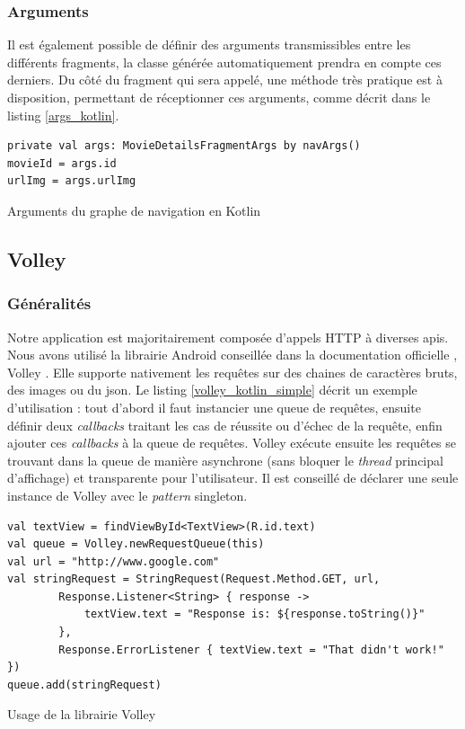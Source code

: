 \subsubsection{Arguments}
Il est également possible de définir des arguments transmissibles entre les différents fragments, la classe générée automatiquement prendra en compte ces derniers. Du côté du fragment qui sera appelé, une méthode très pratique est à disposition, permettant de réceptionner ces arguments, comme décrit dans le listing \ref{args_kotlin}.
\bigbreak
\begin{code}
    \begin{verbatim}
private val args: MovieDetailsFragmentArgs by navArgs()
movieId = args.id
urlImg = args.urlImg
    \end{verbatim}
    \caption{Arguments du graphe de navigation en Kotlin}
    \label{args_kotlin}
\end{code}
\bigbreak


\subsection{Volley}
\subsubsection{Généralités}
Notre application est majoritairement composée d'appels HTTP à diverses \acrshort{api}s. Nous avons utilisé la librairie Android conseillée dans la documentation officielle \cite{docandroid}, Volley \cite{volley}. Elle supporte nativement les requêtes sur des chaines de caractères bruts, des images ou du \acrshort{json}. Le listing \ref{volley_kotlin_simple} décrit un exemple d'utilisation : tout d'abord il faut instancier une queue de requêtes, ensuite définir deux \textit{callbacks} traitant les cas de réussite ou d'échec de la requête, enfin ajouter ces \textit{callbacks} à la queue de requêtes. Volley exécute ensuite les requêtes se trouvant dans la queue de manière asynchrone (sans bloquer le \textit{thread} principal d'affichage) et transparente pour l'utilisateur. Il est conseillé de déclarer une seule instance de Volley avec le \textit{pattern} singleton.
\bigbreak
\begin{code}
    \begin{verbatim}
val textView = findViewById<TextView>(R.id.text)
val queue = Volley.newRequestQueue(this)
val url = "http://www.google.com"
val stringRequest = StringRequest(Request.Method.GET, url,
        Response.Listener<String> { response ->
            textView.text = "Response is: ${response.toString()}"
        },
        Response.ErrorListener { textView.text = "That didn't work!" })
queue.add(stringRequest)
    \end{verbatim}
    \caption{Usage de la librairie Volley}
    \label{volley_kotlin_simple}
\end{code}
\bigbreak

